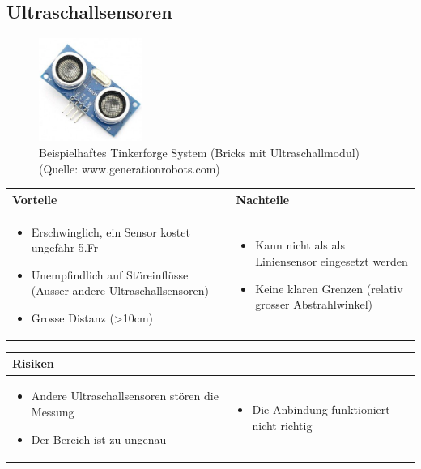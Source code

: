 \pagebreak


\subsection{Ultraschallsensoren}
\begin{figure}[h]
	\centering
	\includegraphics[width=0.3\textwidth]{fig/ultraschallsensor.png}
	\caption{Beispielhaftes Tinkerforge System (Bricks mit Ultraschallmodul) (Quelle: www.generationrobots.com)}
\end{figure}

\begin{table}[h]
\begin{tabular}{p{} | p{}}


\textbf{Vorteile} & \textbf{Nachteile} \\ \hline
	 
\begin{itemize}
\item Erschwinglich, ein Sensor kostet ungefähr 5.Fr
\item Unempfindlich auf Störeinflüsse (Ausser andere Ultraschallsensoren)
\item Grosse Distanz (>10cm)
\end{itemize}
 &
\begin{itemize}
\item Kann nicht als als Liniensensor eingesetzt werden
\item Keine klaren Grenzen (relativ grosser Abstrahlwinkel)
\end{itemize}
\end{tabular}
\end{table}


\begin{table}[h]
\begin{tabular}{p{}p{}}


 \textbf{Risiken} & \\ \hline
	 
\begin{itemize}
\item Andere Ultraschallsensoren stören die Messung
\item Der Bereich ist zu ungenau
\end{itemize}
&
\begin{itemize}
\item Die Anbindung funktioniert nicht richtig
\end{itemize}

 
\end{tabular}
\end{table}


